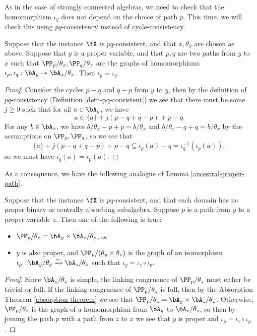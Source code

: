 As in the case of strongly connected algebras, we need to check that the homomorphism $\iota_y$ does not depend on the choice of path $p$. This time, we will check this using $pq$-consistency instead of cycle-consistency.

\begin{lem} Suppose that the instance $\fX$ is $pq$-consistent, and that $x, \theta_x$ are chosen as above. Suppose that $y$ is a proper variable, and that $p,q$ are two paths from $y$ to $x$ such that $\PP_p/\theta_x, \PP_q/\theta_x$ are the graphs of homomorphisms $\iota_p, \iota_q: \bA_y \twoheadrightarrow \bA_x/\theta_x$. Then $\iota_p = \iota_q$.
\end{lem}
\begin{proof} Consider the cycles $p-q$ and $q-p$ from $y$ to $y$, then by the definition of $pq$-consistency (Definition \ref{defn-pq-consistent}) we see that there must be some $j \ge 0$ such that for all $a \in \bA_y$, we have
\[
a \in \{a\} + j(p-q + q-p) + p-q.
\]
For any $b \in \bA_x$, we have $b/\theta_x - p + p = b/\theta_x$ and $b/\theta_x - q + q = b/\theta_x$ by the assumptions on $\PP_p, \PP_q$, so we see that
\[
\{a\} + j(p-q + q-p) + p-q \subseteq \iota_p(a) - q = \iota_q^{-1}(\iota_p(a)),
\]
so we must have $\iota_q(a) = \iota_p(a)$.
\end{proof}

As a consequence, we have the following analogue of Lemma \ref{ancestral-proper-path}.

\begin{lem}\label{proper-path} Suppose that the instance $\fX$ is $pq$-consistent, and that each domain has no proper binary or centrally absorbing subalgebra. Suppose $p$ is a path from $y$ to a proper variable $z$. Then one of the following is true:
\begin{itemize}
\item $\PP_p/\theta_z = \bA_y \times \bA_z/\theta_z$, or

\item $y$ is also proper, and $\PP_p/(\theta_y\times\theta_z)$ is the graph of an isomorphism $\iota_p : \bA_y/\theta_y \xrightarrow{\sim} \bA_z/\theta_z$ such that $\iota_y = \iota_z \circ \iota_p$.
\end{itemize}
\end{lem}
\begin{proof} Since $\bA_z/\theta_z$ is simple, the linking congruence of $\PP_p/\theta_z$ must either be trivial or full. If the linking congruence of $\PP_p/\theta_z$ is full, then by the Absorption Theorem \ref{absorption-theorem} we see that $\PP_p/\theta_z = \bA_y \times \bA_z/\theta_z$. Otherwise, $\PP_p/\theta_z$ is the graph of a homomorphism from $\bA_y$ to $\bA_z/\theta_z$, so then by joining the path $p$ with a path from $z$ to $x$ we see that $y$ is proper and $\iota_y = \iota_z \circ \iota_p$.
\end{proof}

